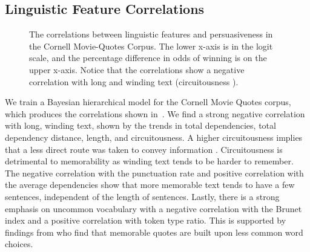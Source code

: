 \subsection{Linguistic Feature Correlations}
\label{subsec:si_mem_corr}
\begin{figure}[t]

  \centering
  \caption{The correlations between linguistic features and persuasiveness in the Cornell Movie-Quotes Corpus. The lower x-axis is in the logit scale, and the percentage difference in odds of winning is on the upper x-axis. Notice that the correlations show a negative correlation with long and winding text (\ie circuitousness \citep{toubia-2021}). }
  \label{fig:mem_feature_correlations}
\end{figure}

We train a Bayesian hierarchical model for the Cornell Movie Quotes corpus, which produces the correlations shown in~. We find a strong negative correlation with long, winding text, shown by the trends in total dependencies, total dependency distance, length, and circuitousness. A higher circuitousness implies that a less direct route was taken to convey information \citep{toubia-2021}. Circuitousness is detrimental to memorability as winding text tends to be harder to remember. The negative correlation with the punctuation rate and positive correlation with the average dependencies show that more memorable text tends to have a few sentences, independent of the length of sentences. Lastly, there is a strong emphasis on uncommon vocabulary with a negative correlation with the Brunet index and a positive correlation with token type ratio. This is supported by findings from \citep{danescu-niculescu-mizil-etal-2012-hello} who find that memorable quotes are built upon less common word choices. 

